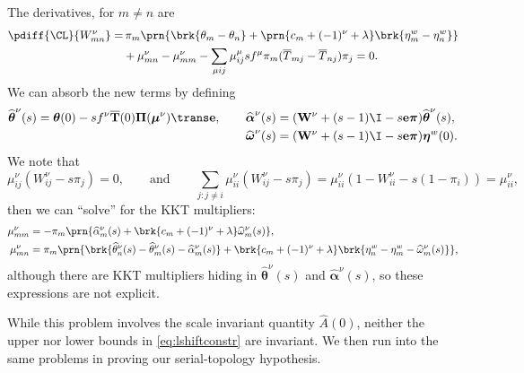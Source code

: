 \documentclass[12pt]{article}
\newcommand{\onev}{\mathbf{e}}
\newcommand{\eqm}{\pi}
\newcommand{\eq}{\boldsymbol{\eqm}}
\newcommand{\Eqm}{\Pi}
\newcommand{\Eq}{\boldsymbol{\Eqm}}
\newcommand{\fptm}{T}
\newcommand{\fpt}{\mathbf{\fptm}}
\newcommand{\fptbm}{\overline{\fptm}}
\newcommand{\fptb}{\overline{\fpt}}
\newcommand{\etwm}{\eta^w}
\newcommand{\etw}{\boldsymbol{\eta}^w}
\newcommand{\thbm}{\theta}
\newcommand{\thb}{\boldsymbol{\thbm}}
\newcommand{\ombm}{\omega}
\newcommand{\omb}{\boldsymbol{\ombm}}
\newcommand{\albm}{\alpha}
\newcommand{\alb}{\boldsymbol{\albm}}
\newcommand{\Wm}{W}
\newcommand{\W}{\mathbf{\Wm}}
\newcommand{\kktm}{\mu}
\newcommand{\kkt}{\boldsymbol{\kktm}}
\newcommand{\shift}[1]{\widehat{#1}}
\begin{document}
The derivatives, for \(m \neq n\) are
%
\begin{equation}\label{eq:lshiftderivs}
\begin{aligned}
  \pdiff{\CL}{\Wm^\nu_{mn}} = & \,
    \eqm_m \prn{ \brk{\thbm_m - \thbm_n}
     + \prn{{c}_m + (-1)^\nu + \lambda} \brk{\etwm_m - \etwm_n} } \\
     &+ \kktm^\nu_{mn} -  \kktm^\nu_{mm}
     - \sum_{\mu ij} \kktm^\mu_{ij} s f^\mu \eqm_m (\fptbm_{mj} - \fptbm_{nj}) \eqm_j
    = 0.
\end{aligned}
\end{equation}
%
We can absorb the new terms by defining
%
\begin{equation*}
\begin{aligned}
  \shift{\thb}^\nu(s) = \thb(0) - s f^\nu \fptb(0) \Eq (\kkt^\nu)\trans \onev,
  \qquad
  \shift{\alb}^\nu(s) &= (\W^\nu + (s - 1) \I - s \onev \eq) \shift{\thb}^\nu(s),
  \\
  \shift{\omb}^\nu(s) &= (\W^\nu + (s - 1) \I - s \onev \eq) \etw(0).
\end{aligned}
\end{equation*}
%
We note that
%
\begin{equation*}
  \kktm^\nu_{ij} (\Wm^\nu_{ij} - s \eqm_j) = 0,
  \qquad \text{and} \qquad
  \sum_{j: j \neq i} \kktm^\nu_{ii} (\Wm^\nu_{ij} - s \eqm_j)
      = \kktm^\nu_{ii} (1 - \Wm^\nu_{ii} - s (1 - \eqm_i)) = \kktm^\nu_{ii},
\end{equation*}
%
then we can ``solve'' for the KKT multipliers:
%
\begin{equation}\label{eq:lshiftsol}
\begin{aligned}
  \kktm^\nu_{mm} &= - \eqm_m \prn{ \shift{\albm}^\nu_m(s) 
    + \brk{ {c}_m + (-1)^\nu + \lambda } \shift{\ombm}^\nu_m(s)
    }, \\
  \kktm^\nu_{mn} &= \eqm_m \prn{ 
      \brk{ \shift{\thbm}^\nu_n(s) - \shift{\thbm}^\nu_m(s) - \shift{\albm}^\nu_m(s) }
    + \brk{ {c}_m + (-1)^\nu + \lambda } 
        \brk{ \etwm_n - \etwm_m - \shift{\ombm}^\nu_m(s) }
     }, \\
\end{aligned}
\end{equation}
%
although there are KKT multipliers hiding in \(\shift{\thb}^\nu(s)\) and \(\shift{\alb}^\nu(s)\), so these expressions are not explicit.

While this problem involves the scale invariant quantity \(\hat{A}(0)\), neither the upper nor lower bounds in \cref{eq:lshiftconstr} are invariant.
We then run into the same problems in proving our serial-topology hypothesis.
\end{document}
